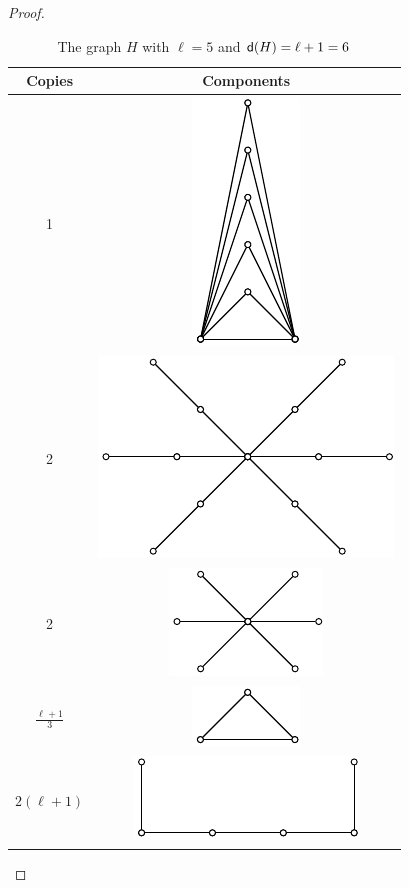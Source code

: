 \begin{proof}
\begin{table} [ht]
\centering
\begin{minipage}{.4\linewidth}
\centering
\caption{The graph $ H $ with $ \ell = 5 $ and $ {\mathsf{d}}(H) = \ell + 1 = 6 $}
\begin{tabular}
{c|c} \hline Copies & Components \\
\hline 1 & \includegraphics[width=0.15\columnwidth]{graphs/Hplanartriangle1.pdf} \\
\hline 2 & \includegraphics[width=0.5\columnwidth]{graphs/Hplanartriangle2.pdf} \\
\hline 2 & \includegraphics[width=0.3\columnwidth]{graphs/Hplanartriangle3.pdf} \\
\hline $ \frac{\ell+1}{3} $ & \includegraphics[width=0.2\columnwidth]{graphs/Hplanartriangle4.pdf} \\
\hline $ 2(\ell+1) $ & \includegraphics[width=0.45\columnwidth]{graphs/Hplanartriangle5.pdf} \\

\end{tabular}
\end{minipage}
\end{table}
\end{proof}
